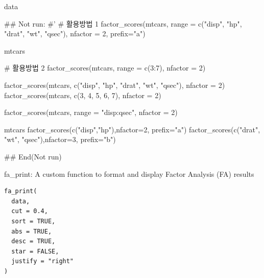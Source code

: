 \documentclass[a4paper]{book}
\begin{document}
%
\begin{Value}
data
\end{Value}
%
\begin{Examples}
\begin{ExampleCode}


\#\# Not run: 
#'
# 활용방법 1
factor_scores(mtcars,
              range = c("disp", "hp", "drat", "wt", "qsec"),
              nfactor = 2, prefix="a")

mtcars %

# 활용방법 2
factor_scores(mtcars, range = c(3:7), nfactor = 2)

factor_scores(mtcars, c("disp", "hp", "drat", "wt", "qsec"), nfactor = 2)
factor_scores(mtcars, c(3, 4, 5, 6, 7), nfactor = 2)

factor_scores(mtcars, range = "disp:qsec", nfactor = 2)


mtcars %
  factor_scores(c("disp","hp"),nfactor=2, prefix="a") %
  factor_scores(c("drat", "wt", "qsec"),nfactor=3, prefix="b") %


## End(Not run)
\end{ExampleCode}
\end{Examples}
%
\begin{Description}
fa\_print: A custom function to format and display Factor Analysis (FA) results
\end{Description}
%
\begin{Usage}
\begin{verbatim}
fa_print(
  data,
  cut = 0.4,
  sort = TRUE,
  abs = TRUE,
  desc = TRUE,
  star = FALSE,
  justify = "right"
)
\end{verbatim}
\end{Usage}
%
\end{document}
